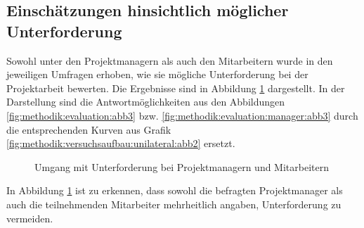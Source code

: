 \subsection{Einschätzungen hinsichtlich möglicher Unterforderung}
\label{ch:ergebnisse:fallstudie:kurven}
Sowohl unter den Projektmanagern als auch den Mitarbeitern wurde in den jeweiligen Umfragen erhoben, wie sie mögliche Unterforderung bei der Projektarbeit bewerten. Die Ergebnisse sind in Abbildung \ref{fig:ergebnisse:fallstudie:kurven:abb1} dargestellt. In der Darstellung sind die Antwortmöglichkeiten aus den Abbildungen \ref{fig:methodik:evaluation:abb3} bzw. \ref{fig:methodik:evaluation:manager:abb3} durch die entsprechenden Kurven aus Grafik \ref{fig:methodik:versuchsaufbau:unilateral:abb2} ersetzt.

\begin{figure}[h]
	\centering
	
	
	\caption{Umgang mit Unterforderung bei Projektmanagern und Mitarbeitern}
	\label{fig:ergebnisse:fallstudie:kurven:abb1}
\end{figure}

In Abbildung \ref{fig:ergebnisse:fallstudie:kurven:abb1} ist zu erkennen, dass sowohl die befragten Projektmanager als auch die teilnehmenden Mitarbeiter mehrheitlich angaben, Unterforderung zu vermeiden.
